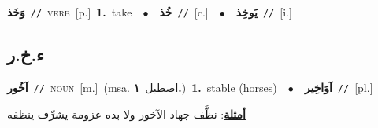 \documentclass[10pt,a4paper,twoside]{article} %
\begin{document}
\begin{multicols}{2}
{\setlength\topsep{0pt}\textbf{\foreignlanguage{arabic}{وَخَذ}}\ {\color{gray}\texttt{//}\color{black}}\ \textsc{verb}\ [p.]\ \textbf{1.}~take\ \ $\bullet$\ \ \setlength\topsep{0pt}\textbf{\foreignlanguage{arabic}{خُذ}}\ {\color{gray}\texttt{//}\color{black}}\ [c.]\ \ $\bullet$\ \ \setlength\topsep{0pt}\textbf{\foreignlanguage{arabic}{يَوخِذ}}\ {\color{gray}\texttt{//}\color{black}}\ [i.]\ } \vspace{2mm}

\vspace{-3mm}
\subsection*{\color{blue}\foreignlanguage{arabic}{ء.خ.ر}\color{blue}{}} 

{\setlength\topsep{0pt}\textbf{\foreignlanguage{arabic}{آخُور}}\ {\color{gray}\texttt{//}\color{black}}\ \textsc{noun}\ [m.]\ \color{gray}(msa. \foreignlanguage{arabic}{اصطبل}~\foreignlanguage{arabic}{\textbf{١.}})\color{black}\ \textbf{1.}~stable (horses)\ \ $\bullet$\ \ \setlength\topsep{0pt}\textbf{\foreignlanguage{arabic}{آوَاخِير}}\ {\color{gray}\texttt{//}\color{black}}\ [pl.]\  \begin{flushright}\color{gray}\foreignlanguage{arabic}{\textbf{\underline{\foreignlanguage{arabic}{أمثلة}}}: نظَّف جهاد الآخور ولا بده عزومة يشرِّف ينظفه}\end{flushright}\color{black}} \vspace{2mm}


\end{multicols}
\end{document}
